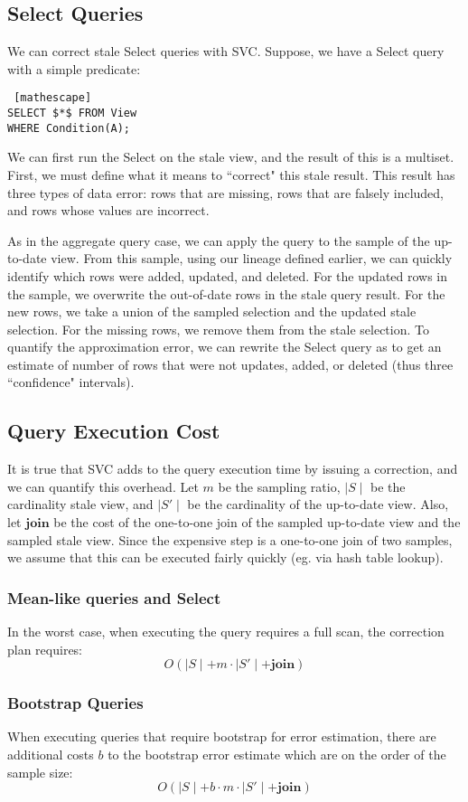 \subsection{Select Queries}
We can correct stale Select queries with SVC.
Suppose, we have a Select query with a simple predicate:
\begin{lstlisting} [mathescape]
SELECT $*$ FROM View 
WHERE Condition(A);
\end{lstlisting}

We can first run the Select on the stale view, and the result of this is a multiset.
First, we must define what it means to ``correct" this stale result.
This result has three types of data error: rows that are missing, rows that are falsely included, and rows whose values are incorrect.

As in the aggregate query case, we can apply the query to the sample of the up-to-date view.
From this sample, using our lineage defined earlier, we can quickly identify which rows were added, updated, and deleted.
For the updated rows in the sample, we overwrite the out-of-date rows in the stale query result.
For the new rows, we take a union of the sampled selection and the updated stale selection.
For the missing rows, we remove them from the stale selection.
To quantify the approximation error, we can rewrite the Select query as \countfunc to get an estimate of number of rows that were not updates, added, or deleted (thus three ``confidence" intervals).

\subsection{Query Execution Cost}
It is true that SVC adds to the query execution time by issuing a correction, and we can quantify this overhead. Let $m$ be the sampling ratio, $\mid S \mid$ be the cardinality stale view, and $\mid S' \mid$ be the cardinality  of the up-to-date view. Also, let $\textbf{join}$ be the cost of the one-to-one join of the sampled up-to-date view and the sampled stale view. Since the expensive step is a one-to-one join of two samples, we assume that this can be executed fairly quickly (eg. via hash table lookup).

\subsubsection{Mean-like queries and Select}
In the worst case, when executing the query requires a full scan, the correction plan requires:
 \[O(\mid S \mid + m \cdot \mid S' \mid + \textbf{join})\]

 \subsubsection{Bootstrap Queries}
When executing queries that require bootstrap for error estimation, there are additional costs $b$ to the bootstrap error estimate which are on the order of the sample size:
 \[O(\mid S \mid + b\cdot m \cdot \mid S' \mid + \textbf{join})\]

